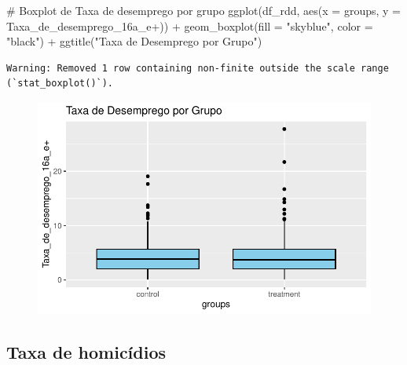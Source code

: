 \documentclass[
  letterpaper,
  DIV=11,
  numbers=noendperiod]{scrartcl}
\newenvironment{Shaded}{\begin{snugshade}}{\end{snugshade}}
\newcommand{\AttributeTok}[1]{\textcolor[rgb]{0.40,0.45,0.13}{#1}}
\newcommand{\CommentTok}[1]{\textcolor[rgb]{0.37,0.37,0.37}{#1}}
\newcommand{\FunctionTok}[1]{\textcolor[rgb]{0.28,0.35,0.67}{#1}}
\newcommand{\NormalTok}[1]{\textcolor[rgb]{0.00,0.23,0.31}{#1}}
\newcommand{\SpecialCharTok}[1]{\textcolor[rgb]{0.37,0.37,0.37}{#1}}
\newcommand{\StringTok}[1]{\textcolor[rgb]{0.13,0.47,0.30}{#1}}
\begin{document}
\begin{Shaded}
\begin{Highlighting}[]
\CommentTok{\# Boxplot de Taxa de desemprego por grupo}
\FunctionTok{ggplot}\NormalTok{(df\_rdd, }\FunctionTok{aes}\NormalTok{(}\AttributeTok{x =}\NormalTok{ groups, }\AttributeTok{y =} \StringTok{\textasciigrave{}}\AttributeTok{Taxa\_de\_desemprego\_16a\_e+}\StringTok{\textasciigrave{}}\NormalTok{)) }\SpecialCharTok{+}
  \FunctionTok{geom\_boxplot}\NormalTok{(}\AttributeTok{fill =} \StringTok{"skyblue"}\NormalTok{, }\AttributeTok{color =} \StringTok{"black"}\NormalTok{) }\SpecialCharTok{+}
  \FunctionTok{ggtitle}\NormalTok{(}\StringTok{"Taxa de Desemprego por Grupo"}\NormalTok{)}
\end{Highlighting}
\end{Shaded}

\begin{verbatim}
Warning: Removed 1 row containing non-finite outside the scale range
(`stat_boxplot()`).
\end{verbatim}

\begin{figure}[H]

{\centering \includegraphics{maps_files/figure-pdf/unnamed-chunk-18-2.pdf}

}

\end{figure}

\hypertarget{taxa-de-homicuxeddios}{%
\subsection{Taxa de homicídios}\label{taxa-de-homicuxeddios}}
\end{document}

